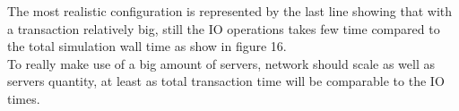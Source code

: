 The most realistic configuration is represented by the last line showing that
with a transaction relatively big, still the IO operations takes few time
compared to the total simulation wall time as show in figure 16. \\
To really make use of a big amount of servers, network should scale as well as
servers quantity, at least as total transaction time will be comparable to the
IO times.

